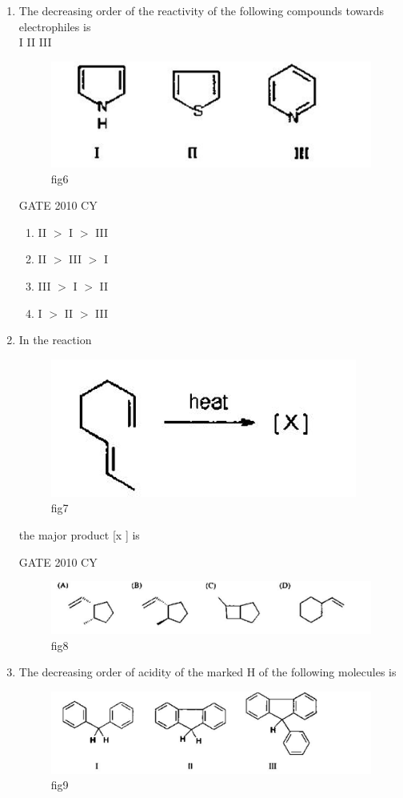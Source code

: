 \documentclass[journal,12pt,onecolumn]{IEEEtran}
\theoremstyle{remark}
\begin{document}
\begin{enumerate}
\item The decreasing order of the reactivity of the following compounds towards electrophiles is\\
I \hspace{3em} II \hspace{3em} III


\begin{figure}[H]
    \centering
    \includegraphics[width=0.5\linewidth]{figs/Q.13.png}
    \caption{fig6}
    \label{fig:figs/Q.13.png}
\end{figure}
\hfill{GATE 2010 CY}

\begin{multicols}{2}
\begin{enumerate}
    \item II $>$ I $>$ III
    \item II $>$ III $>$ I
    \item III $>$ I $>$ II
    \item I $>$ II $>$ III
\end{enumerate}
\end{multicols}

\item 
In the reaction
\begin{figure}[H]
    \centering
    \includegraphics[width=0.5\linewidth]{figs/Q.15.png}
    \caption{fig7}
    \label{fig:figs/Q.15.png}
\end{figure}
the major product [x ] is

\hfill{GATE 2010 CY}
\begin{figure}[H]
    \centering
    \includegraphics[width=0.75\linewidth]{figs/Q.15.1.png}
    \caption{fig8}
    \label{fig:figs/Q.15.1.png}
\end{figure}
\item The decreasing order of acidity of the marked H of the following molecules is\\
\begin{figure}[H]
    \centering
    \includegraphics[width=0.5\linewidth]{figs/Q.16.png}
    \caption{fig9}
    \label{fig:figs/Q.16.png}
\end{figure}


\end{enumerate}
\end{document}

